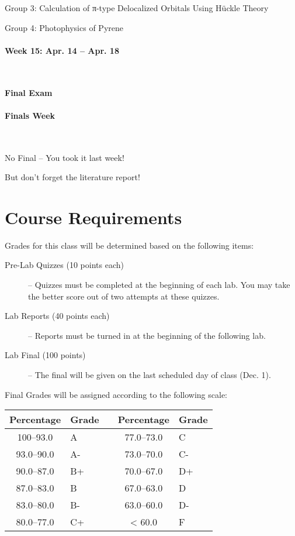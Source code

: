 \documentclass[12pt, letterpaper]{article}
\begin{document}
Group 3: Calculation of π-type Delocalized Orbitals Using Hückle Theory

Group 4: Photophysics of Pyrene

\paragraph{Week 15: Apr. 14 -- Apr. 18}~

\textbf{Final Exam}

\paragraph{Finals Week}~

No Final -- You took it last week!

But don't forget the literature report!

\section*{Course Requirements}
Grades for this class will be determined based on the following items:

\begin{description}
	\item[Pre-Lab Quizzes (10 points each)] -- Quizzes must be completed at the beginning of each lab. You may take the better score out of two attempts at these quizzes.
	\item[Lab Reports (40 points each)] -- Reports must be turned in at the beginning of the following lab.
	\item[Lab Final (100 points)] -- The final will be given on the last scheduled day of class (Dec. 1).
\end{description}

\noindent Final Grades will be assigned according to the following scale:

\begin{tabular}{cl|c|cl}
	Percentage & Grade &  & Percentage & Grade \\ \midrule
	100--93.0  & A     &  & 77.0--73.0 & C     \\
	93.0--90.0 & A-    &  & 73.0--70.0 & C-    \\
	90.0--87.0 & B+    &  & 70.0--67.0 & D+    \\
	87.0--83.0 & B     &  & 67.0--63.0 & D     \\
	83.0--80.0 & B-    &  & 63.0--60.0 & D-    \\
	80.0--77.0 & C+    &  & < 60.0     & F
\end{tabular}
\end{document}
